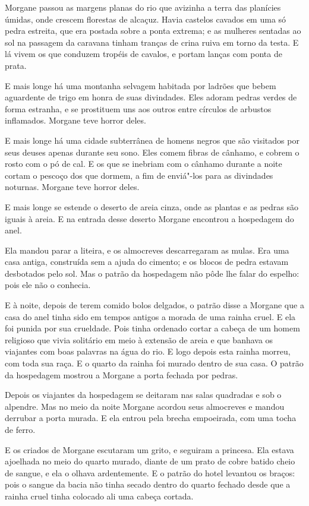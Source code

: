 Morgane passou as margens planas do rio que avizinha a terra das
planícies úmidas, onde crescem florestas de alcaçuz. Havia castelos
cavados em uma só pedra estreita, que era postada sobre a ponta extrema; e
as mulheres sentadas ao sol na passagem da caravana tinham tranças de
crina ruiva em torno da testa. E lá vivem os que conduzem tropéis de
cavalos, e portam lanças com ponta de prata.

E mais longe há uma montanha selvagem habitada por ladrões que bebem
aguardente de trigo em honra de suas divindades. Eles adoram pedras verdes
de forma estranha, e se prostituem uns aos outros entre círculos de
arbustos inflamados. Morgane teve horror deles.

E mais longe há uma cidade subterrânea de homens negros que são
visitados por seus deuses apenas durante seu sono. Eles comem fibras de
cânhamo, e cobrem o rosto com o pó de cal. E os que se inebriam com o
cânhamo durante a noite cortam o pescoço dos que dormem, a fim de
enviá"-los para as divindades noturnas. Morgane teve horror deles.

E mais longe se estende o deserto de areia cinza, onde as plantas e as
pedras são iguais à areia. E na entrada desse deserto Morgane encontrou a
hospedagem do anel.

Ela mandou parar a liteira, e os almocreves descarregaram as mulas. Era
uma casa antiga, construída sem a ajuda do cimento; e os blocos de pedra
estavam desbotados pelo sol. Mas o patrão da hospedagem não pôde lhe falar
do espelho: pois ele não o conhecia.

E à noite, depois de terem comido bolos delgados, o patrão disse a
Morgane que a casa do anel tinha sido em tempos antigos a morada de uma
rainha cruel. E ela foi punida por sua crueldade. Pois tinha ordenado
cortar a cabeça de um homem religioso que vivia solitário em meio à extensão
de areia e que banhava os viajantes com boas palavras na água do rio. E
logo depois esta rainha morreu, com toda sua raça. E o quarto da rainha
foi murado dentro de sua casa. O patrão da hospedagem mostrou a Morgane a
porta fechada por pedras.

Depois os viajantes da hospedagem se deitaram nas salas quadradas e sob
o alpendre. Mas no meio da noite Morgane acordou seus almocreves e mandou
derrubar a porta murada. E ela entrou pela brecha empoeirada, com uma
tocha de ferro.

E os criados de Morgane escutaram um grito, e seguiram a princesa. Ela
estava ajoelhada no meio do quarto murado, diante de um prato de cobre
batido cheio de sangue, e ela o olhava ardentemente. E o patrão do hotel
levantou os braços: pois o sangue da bacia não tinha secado dentro do
quarto fechado desde que a rainha cruel tinha colocado ali uma cabeça
cortada.

